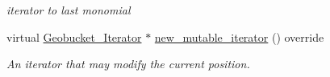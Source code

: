 \begin{Indent}
\begin{DoxyCompactItemize}
\begin{DoxyCompactList}\small\item\em iterator to last monomial \end{DoxyCompactList}\item 
\mbox{\label{group__polygroup_a630c245914a9235dd84af2b34deb778d}} 
virtual \hyperlink{group___iterator_group_class_geobucket___iterator}{Geobucket\+\_\+\+Iterator} $\ast$ \hyperlink{group__polygroup_a630c245914a9235dd84af2b34deb778d}{new\+\_\+mutable\+\_\+iterator} () override
\begin{DoxyCompactList}\small\item\em An iterator that may modify the current position. \end{DoxyCompactList}\end{DoxyCompactItemize}
\end{Indent}
